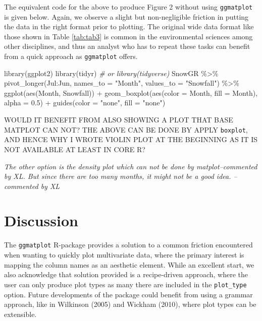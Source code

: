 \documentclass[10pt,a4paper,onecolumn]{article}
\newenvironment{Shaded}{\begin{snugshade}}{\end{snugshade}}
\newcommand{\AttributeTok}[1]{\textcolor[rgb]{0.77,0.63,0.00}{#1}}
\newcommand{\CommentTok}[1]{\textcolor[rgb]{0.56,0.35,0.01}{\textit{#1}}}
\newcommand{\FloatTok}[1]{\textcolor[rgb]{0.00,0.00,0.81}{#1}}
\newcommand{\FunctionTok}[1]{\textcolor[rgb]{0.00,0.00,0.00}{#1}}
\newcommand{\NormalTok}[1]{#1}
\newcommand{\SpecialCharTok}[1]{\textcolor[rgb]{0.00,0.00,0.00}{#1}}
\newcommand{\StringTok}[1]{\textcolor[rgb]{0.31,0.60,0.02}{#1}}
\begin{document}
The equivalent code for the above to produce Figure 2 without using
\texttt{ggmatplot} is given below. Again, we observe a slight but
non-negligible friction in putting the data in the right format prior to
plotting. The original wide data format like those shown in Table
\ref{tab:tab3} is common in the environmental sciences among other
disciplines, and thus an analyst who has to repeat these tasks can
benefit from a quick approach as \texttt{ggmatplot} offers.

\begin{Shaded}
\begin{Highlighting}[]
\FunctionTok{library}\NormalTok{(ggplot2)}
\FunctionTok{library}\NormalTok{(tidyr) }\CommentTok{\# or library(tidyverse)}
\NormalTok{SnowGR }\SpecialCharTok{\%\textgreater{}\%} 
  \FunctionTok{pivot\_longer}\NormalTok{(Jul}\SpecialCharTok{:}\NormalTok{Jun, }
               \AttributeTok{names\_to =} \StringTok{"Month"}\NormalTok{,}
               \AttributeTok{values\_to =} \StringTok{"Snowfall"}\NormalTok{) }\SpecialCharTok{\%\textgreater{}\%} 
  \FunctionTok{ggplot}\NormalTok{(}\FunctionTok{aes}\NormalTok{(Month, Snowfall)) }\SpecialCharTok{+} 
  \FunctionTok{geom\_boxplot}\NormalTok{(}\FunctionTok{aes}\NormalTok{(}\AttributeTok{color =}\NormalTok{ Month, }\AttributeTok{fill =}\NormalTok{ Month), }\AttributeTok{alpha =} \FloatTok{0.5}\NormalTok{) }\SpecialCharTok{+}
  \FunctionTok{guides}\NormalTok{(}\AttributeTok{color =} \StringTok{"none"}\NormalTok{, }\AttributeTok{fill =} \StringTok{"none"}\NormalTok{)}
\end{Highlighting}
\end{Shaded}

WOULD IT BENEFIT FROM ALSO SHOWING A PLOT THAT BASE MATPLOT CAN NOT? THE
ABOVE CAN BE DONE BY APPLY \texttt{boxplot}, AND HENCE WHY I WROTE
VIOLIN PLOT AT THE BEGINNING AS IT IS NOT AVAILABLE AT LEAST IN CORE R?

\emph{The other option is the density plot which can not be done by
matplot--commented by XL. But since there are too many months, it might
not be a good idea. -- commented by XL}

\hypertarget{discussion}{%
\section{Discussion}\label{discussion}}

The \texttt{ggmatplot} R-package provides a solution to a common
friction encountered when wanting to quickly plot multivariate data,
where the primary interest is mapping the column names as an aesthetic
element. While an excellent start, we also acknowledge that solution
provided is a recipe-driven approach, where the user can only produce
plot types as many there are included in the \texttt{plot\_type} option.
Future developments of the package could benefit from using a grammar
approach, like in Wilkinson (2005) and Wickham (2010), where plot types
can be extensible.
\end{document}
